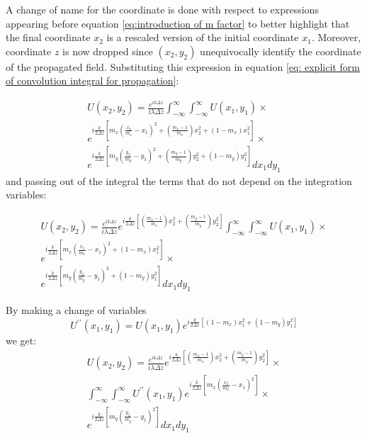 \documentclass{iucr}              %
\begin{document}
A change of name for the coordinate is done  with respect to expressions appearing before equation \ref{eq:introduction of m factor} to better highlight that the final coordinate $x_2$ is a rescaled version of the initial coordinate $x_1$. Moreover, coordinate $z$ is now dropped since $(x_2,y_2)$ unequivocally identify the coordinate of the propagated field.
Substituting this expression in equation \ref{eq: explicit form of convolution integral for propagation}:

\begin{multline} \label{eq: propagation with m factor and no manupulation}
U(x_2, y_2) = \frac {e^{ik\Delta z }}{ i \lambda \Delta z} \int_{-\infty}^{\infty} \int_{-\infty}^{\infty}U(x_1, y_1) \times \\
e^{i \frac{k}{2 \Delta z} [m_x (\frac{x_2}{m_x}-x_1)^2 + (\frac{m_x - 1}{m_x})x_2^2 + (1-m_x)x_1^2]} \times \\
e^{i \frac{k}{2 \Delta z}[m_y (\frac{y_2}{m_y}-y_1)^2 + (\frac{m_y - 1}{m_y})y_2^2 + (1-m_y)y_1^2]} dx_1 dy_1
\end{multline}
and passing out of the integral the terms that do not depend on the integration variables:

\begin{multline}\label{eq: propagation with m factor and manipulation}
U(x_2, y_2) = \frac {e^{ik\Delta z }}{ i \lambda \Delta z} e^{i \frac{k}{2 \Delta z} [(\frac{m_x - 1}{m_x})x_2^2 + (\frac{m_y - 1}{m_y})y_2^2]} 
\int_{-\infty}^{\infty} \int_{-\infty}^{\infty}U(x_1, y_1) \times \\
e^{i \frac{k}{2 \Delta z} [m_x (\frac{x_2}{m_x}-x_1)^2 + (1-m_x)x_1^2]} \times \\
e^{i \frac{k}{2 \Delta z}[m_y (\frac{y_2}{m_y}-y_1)^2 + (1-m_y)y_1^2]} dx_1 dy_1
\end{multline}

By making a change of variables
\begin{equation} \label{eq: substitution of U}
U^{\prime\prime} (x_1, y_1) = U(x_1, y_1) e^{i \frac{k}{2 \Delta z} [(1-m_x)x_1^2 + (1-m_y)y_1^2]}
\end{equation}
we get:
\begin{multline}\label{eq: substitution of U in integral}
U(x_2, y_2) = \frac {e^{ik\Delta z }}{ i \lambda \Delta z} e^{i \frac{k}{2 \Delta z} [(\frac{m_x - 1}{m_x})x_2^2 + (\frac{m_y - 1}{m_y})y_2^2]} \times \\ \int_{-\infty}^{\infty} \int_{-\infty}^{\infty} U^{\prime \prime}(x_1, y_1)
e^{i \frac{k}{2 \Delta z} [m_x (\frac{x_2}{m_x}-x_1)^2]} \times \\
e^{i \frac{k}{2 \Delta z}[m_y (\frac{y_2}{m_y}-y_1)^2]} dx_1 dy_1
\end{multline}
\end{document}
